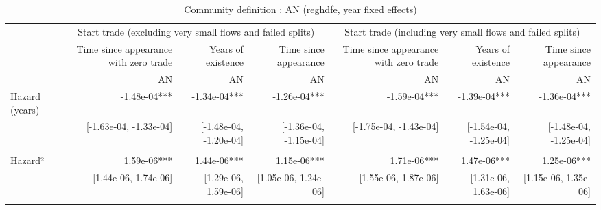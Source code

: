 \begin{table}[!h]
\caption{Community definition : AN (reghdfe, year fixed effects)}
\centering
\begin{tabular}{lllllll}
\cline{1-7}
\multicolumn{1}{c}{} &
  \multicolumn{3}{|c}{Start trade (excluding very small flows and failed splits)} &
  \multicolumn{3}{c}{Start trade (including very small flows and failed splits)} \\
\multicolumn{1}{c}{} &
  \multicolumn{1}{|r}{Time since appearance with zero trade} &
  \multicolumn{1}{r}{Years of existence} &
  \multicolumn{1}{r}{Time since appearance} &
  \multicolumn{1}{r}{Time since appearance with zero trade} &
  \multicolumn{1}{r}{Years of existence} &
  \multicolumn{1}{r}{Time since appearance} \\
\multicolumn{1}{c}{} &
  \multicolumn{1}{|r}{AN} &
  \multicolumn{1}{r}{AN} &
  \multicolumn{1}{r}{AN} &
  \multicolumn{1}{r}{AN} &
  \multicolumn{1}{r}{AN} &
  \multicolumn{1}{r}{AN} \\
\cline{1-7}
\multicolumn{1}{l}{Hazard (years)} &
  \multicolumn{1}{|r}{-1.48e-04***} &
  \multicolumn{1}{r}{-1.34e-04***} &
  \multicolumn{1}{r}{-1.26e-04***} &
  \multicolumn{1}{r}{-1.59e-04***} &
  \multicolumn{1}{r}{-1.39e-04***} &
  \multicolumn{1}{r}{-1.36e-04***} \\
\multicolumn{1}{l}{} &
  \multicolumn{1}{|r}{[-1.63e-04, -1.33e-04]} &
  \multicolumn{1}{r}{[-1.48e-04, -1.20e-04]} &
  \multicolumn{1}{r}{[-1.36e-04, -1.15e-04]} &
  \multicolumn{1}{r}{[-1.75e-04, -1.43e-04]} &
  \multicolumn{1}{r}{[-1.54e-04, -1.25e-04]} &
  \multicolumn{1}{r}{[-1.48e-04, -1.25e-04]} \\
\multicolumn{1}{l}{} &
  \multicolumn{1}{|r}{} &
  \multicolumn{1}{r}{} &
  \multicolumn{1}{r}{} &
  \multicolumn{1}{r}{} &
  \multicolumn{1}{r}{} &
  \multicolumn{1}{r}{} \\
\multicolumn{1}{l}{Hazard²} &
  \multicolumn{1}{|r}{1.59e-06***} &
  \multicolumn{1}{r}{1.44e-06***} &
  \multicolumn{1}{r}{1.15e-06***} &
  \multicolumn{1}{r}{1.71e-06***} &
  \multicolumn{1}{r}{1.47e-06***} &
  \multicolumn{1}{r}{1.25e-06***} \\
\multicolumn{1}{l}{} &
  \multicolumn{1}{|r}{[1.44e-06,  1.74e-06]} &
  \multicolumn{1}{r}{[1.29e-06,  1.59e-06]} &
  \multicolumn{1}{r}{[1.05e-06,  1.24e-06]} &
  \multicolumn{1}{r}{[1.55e-06,  1.87e-06]} &
  \multicolumn{1}{r}{[1.31e-06,  1.63e-06]} &
  \multicolumn{1}{r}{[1.15e-06,  1.35e-06]} \\
\multicolumn{1}{l}{} &
  \multicolumn{1}{|r}{} &
  \multicolumn{1}{r}{} &

\end{tabular}
\end{table}
